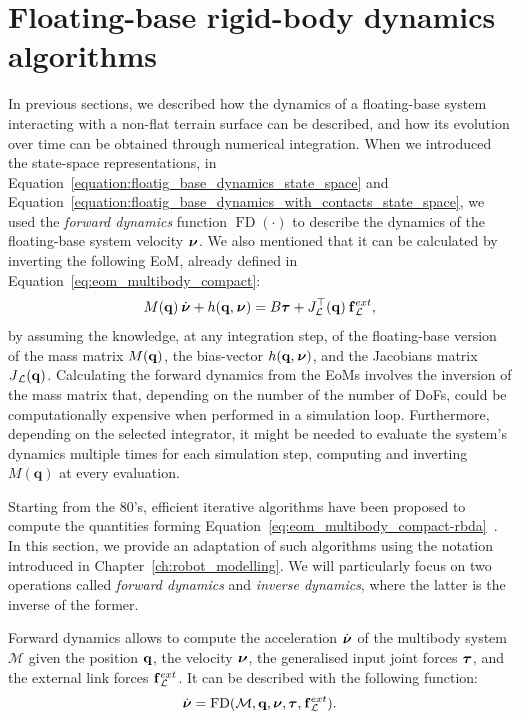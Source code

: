\vspace{-3mm}
\section{Floating-base rigid-body dynamics algorithms}
\label{section:fb_rbda}

In previous sections, we described how the dynamics of a floating-base system interacting with a non-flat terrain surface can be described, and how its evolution over time can be obtained through numerical integration.
When we introduced the state-space representations, in Equation~\eqref{equation:floatig_base_dynamics_state_space} and Equation~\eqref{equation:floatig_base_dynamics_with_contacts_state_space}, we used the \emph{forward dynamics} function $\operatorname{FD}(\cdot)$ to describe the dynamics of the floating-base system velocity $\prescript{}{}{\boldsymbol{\nu}}$.
We also mentioned that it can be calculated by inverting the following \ac{EoM}, already defined in Equation~\eqref{eq:eom_multibody_compact}:
%
\begin{equation}
    \label{eq:eom_multibody_compact-rbda}
    M(\mathbf{q}) \prescript{}{}{\dot{\boldsymbol{\nu}}} + h(\mathbf{q}, \prescript{}{}{\boldsymbol{\nu}}) = B \boldsymbol{\tau} + J_\mathcal{L}^\top(\mathbf{q}) \prescript{}{}{\mathbf{f}}^{ext}_\mathcal{L}
    ,
\end{equation}
%
by assuming the knowledge, at any integration step, of the floating-base version of the mass matrix $M(\mathbf{q})$, the bias-vector $h(\mathbf{q}, \prescript{}{}{\boldsymbol{\nu}})$, and the Jacobians matrix $\prescript{}{}{J}_\mathcal{L}(\mathbf{q})$.
Calculating the forward dynamics from the \acp{EoM} involves the inversion of the mass matrix that, depending on the number of the number of \acp{DoF}, could be computationally expensive when performed in a simulation loop.
Furthermore, depending on the selected integrator, it might be needed to evaluate the system's dynamics multiple times for each simulation step, computing and inverting $M(\mathbf{q})$ at every evaluation.

Starting from the 80's, efficient iterative algorithms have been proposed to compute the quantities forming Equation~\eqref{eq:eom_multibody_compact-rbda}~\parencite{featherstone_rigid_2008}.
In this section, we provide an adaptation of such algorithms using the notation introduced in Chapter~\ref{ch:robot_modelling}.
We will particularly focus on two operations called \emph{forward dynamics} and \emph{inverse dynamics}, where the latter is the inverse of the former.

\begin{definition*}
%
Forward dynamics allows to compute the acceleration $\prescript{}{}{\dot{\boldsymbol{\nu}}}$ of the multibody system $\mathcal{M}$ given the position $\mathbf{q}$, the velocity $\prescript{}{}{\boldsymbol{\nu}}$, the generalised input joint forces $\boldsymbol{\tau}$, and the external link forces $\prescript{}{}{\mathbf{f}}^{ext}_\mathcal{L}$.
It can be described with the following function:
%
\begin{equation*}
    \dot{\boldsymbol{\nu}} = \operatorname{FD}(\mathcal{M}, \mathbf{q}, \boldsymbol{\nu}, \boldsymbol{\tau}, \prescript{}{}{\mathbf{f}}^{ext}_\mathcal{L})
    .
\end{equation*}
%
\end{definition*}

